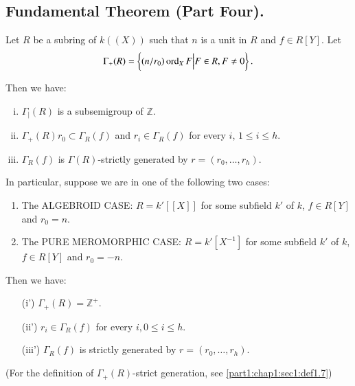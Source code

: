 \setcounter{subsection}{6}
\subsection{Fundamental Theorem (Part Four).}\label{part1:chap3:sec8:ss8.7}

Let $R$ be a subring of $k((X))$ such that $n$ is a unit in $R$ and $f \in R[Y]$. Let
$$
\Gamma_+ (R) = \left\{ (n/r_0) \operatorname{ord}_X F\Big| F \in R, F \neq 0 \right\}.
$$

Then we have:
\begin{enumerate}[(i)]
\item $\Gamma_| (R)$ is a subsemigroup of $\mathbb{Z}$.
\item $\Gamma_+ (R) r_0 \subset \Gamma_R (f)$ and $r_i \in \Gamma_R (f)$ for every $i$, $1 \leq i \leq h$.
\item $\Gamma_R (f)$ is $\Gamma (R)$-strictly generated by $r= (r_0 , \ldots , r_h)$.
\end{enumerate}

In particular, suppose we are in one of the following two cases:

\begin{enumerate}[(1)]
\item 
The ALGEBROID CASE: $R= k'[[X]]$ for some subfield $k'$ of $k$, $f \in R [Y]$ and $r_0 =n$.
\item The PURE MEROMORPHIC CASE: $R = k'[X^{-1}]$ for some subfield $k'$ of $k$, $f \in R [Y]$ and $r_0 =-n$.
\end{enumerate}

Then we have:
\begin{itemize}
\item[(i')] $\Gamma_+ (R)= \mathbb{Z}^+$.
\item[(ii')] $r_i \in \Gamma_R (f)$ for every $i, 0 \leq i \leq h$.
\item[(iii')] $\Gamma_R (f)$ is strictly generated by $r= (r_0, \ldots , r_h)$.
\end{itemize}

(For the definition of $\Gamma_+ (R)$-strict generation, see \ref{part1:chap1:sec1:def1.7})

